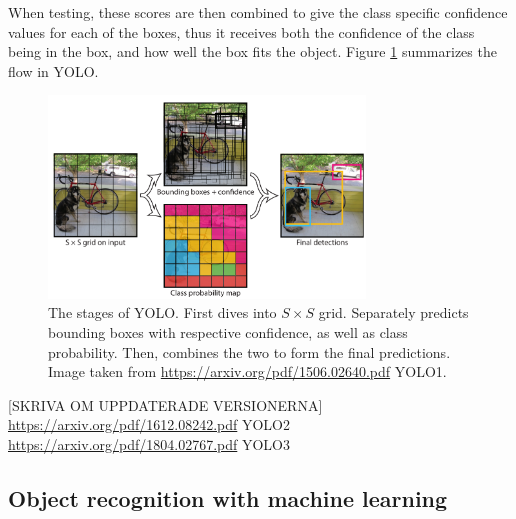  When testing, these scores are then combined to give the class specific confidence values for each of the boxes, thus it receives both the confidence of the class being in the box, and how well the box fits the object. Figure \ref{fig:YOLO_stages} summarizes the flow in YOLO. 
\begin{figure}[hbtp]
\begin{center}
\includegraphics[width = 0.75\textwidth]{./Images/YOLO_stages.PNG} 
\caption{The stages of YOLO. First dives into $S \times S$ grid. Separately predicts bounding boxes with respective confidence, as well as class probability. Then, combines the two to form the final predictions. Image taken from \url{https://arxiv.org/pdf/1506.02640.pdf} YOLO1.}
\label{fig:YOLO_stages}
\end{center}
\end{figure}
[SKRIVA OM UPPDATERADE VERSIONERNA]
\url{https://arxiv.org/pdf/1612.08242.pdf} YOLO2
\url{https://arxiv.org/pdf/1804.02767.pdf} YOLO3
\subsection{Object recognition with machine learning}


\newpage
